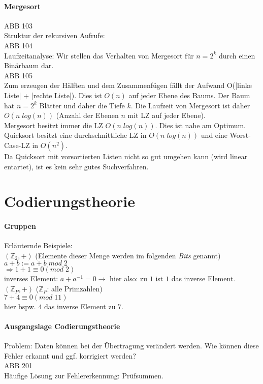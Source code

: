 \paragraph{Mergesort} \parskp
ABB 103\\
Struktur der rekursiven Aufrufe:\\
ABB 104\\
Laufzeitanalyse: Wir stellen das Verhalten von Mergesort für $n=2^k$ durch einen Binärbaum dar.\\
ABB 105\\
Zum erzeugen der Hälften und dem Zusammenfügen fällt der Aufwand O(|linke Liste| + |rechte Liste|). Dies ist $O(n)$ auf jeder Ebene des Baums. Der Baum hat $n=2^k$ Blätter und daher die Tiefe $k$. Die Laufzeit von Mergesort ist daher $O(n\;log(n))$ (Anzahl der Ebenen $n$ mit LZ auf jeder Ebene).\\
Mergesort besitzt immer die LZ $O(n\; log(n))$. Dies ist nahe am Optimum. Quicksort besitzt eine durchschnittliche LZ in $O(n\; log(n))$ und eine Worst-Case-LZ in $O(n^2)$.\\
Da Quicksort mit vorsortierten Listen nicht so gut umgehen kann (wird linear entartet), ist es kein sehr gutes Suchverfahren.

\section{Codierungstheorie}

\paragraph{Gruppen}
Erläuternde Beispiele:\\
$(\mathbb{Z}_2,+)$ (Elemente dieser Menge werden im folgenden \emph{Bits} genannt)\\
$a+b:=a+b\; mod\; 2$\\
$\Rightarrow 1+1\equiv 0 (mod\; 2)$\\
inverses Element: $a+a^{-1}=0 \rightarrow$ hier also: zu $1$ ist $1$ das inverse Element.\medskip\\
$(\mathbb{Z}_P,+)$ ($\mathbb{Z}_P$: alle Primzahlen)\\
$7+4\equiv 0 (mod\; 11)$\\
hier bspw. $4$ das inverse Element zu $7$.

\paragraph{Ausgangslage Codierungstheorie}\parskp
Problem: Daten können bei der Übertragung verändert werden. Wie können diese Fehler erkannt und ggf. korrigiert werden?\\
ABB 201\\
Häufige Lösung zur Fehlererkennung: Prüfsummen.

